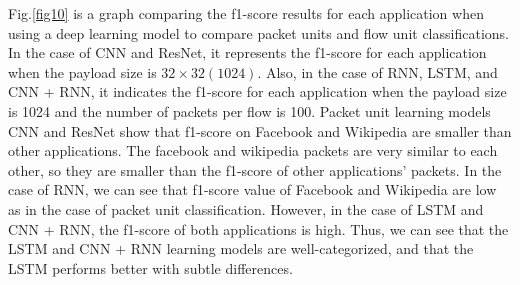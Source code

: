 Fig.\ref{fig10} is a graph comparing the f1-score results for each application when using a deep learning model to compare packet units and flow unit classifications.
In the case of CNN and ResNet, it represents the f1-score for each application when the payload size is $32 \times 32 (1024)$.
Also, in the case of RNN, LSTM, and CNN + RNN, it indicates the f1-score for each application when the payload size is 1024 and the number of packets per flow is 100.
Packet unit learning models CNN and ResNet show that f1-score on Facebook and Wikipedia are smaller than other applications.
The facebook and wikipedia packets are very similar to each other, so they are smaller than the f1-score of other applications' packets.
In the case of RNN, we can see that f1-score value of Facebook and Wikipedia are low as in the case of packet unit classification.
However, in the case of LSTM and CNN + RNN, the f1-score of both applications is high.
Thus, we can see that the LSTM and CNN + RNN learning models are well-categorized, and that the LSTM performs better with subtle differences.